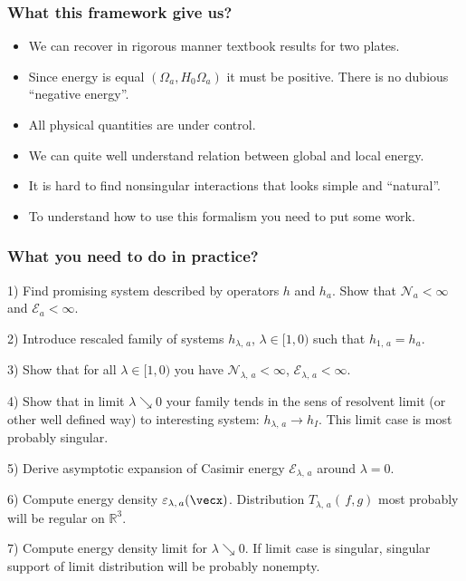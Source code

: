 \documentclass[10pt,t]{beamer}  %
\newcommand{\Ec}{\mathcal{E}}
\begin{document}
\begin{frame}
  \frametitle{What this framework give us?}


  \begin{itemize}
  \item We can recover in rigorous manner textbook results for two
    plates.

  \item Since energy is equal $( \Omega_{ a }, H_{ 0 } \Omega_{ a } )$
    it must be positive. There is no dubious ``negative energy''.

  \item All physical quantities are under control.

  \item We can quite well understand relation between global and local
    energy.

  \item It is hard to find nonsingular interactions that looks simple
    and ``natural''.

  \item To understand how to use this formalism you need to put some
    work.

  \end{itemize}

\end{frame}






\begin{frame}
  \frametitle{What you need to do in practice?}


  1) Find promising system described by operators $h$ and $h_{ a }$.
  Show that $\mathcal{N}_{ a } < \infty$ and $\Ec_{ a } < \infty$.

  2) Introduce rescaled family of systems $h_{ \lambda,\, a }$,
  $\lambda \in [ 1, 0 )$ such that $h_{ 1,\, a } = h_{ a }$.

  3) Show that for all $\lambda \in [ 1, 0 )$ you have
  $\mathcal{N}_{ \lambda,\, a } < \infty$,
  $\Ec_{ \lambda,\, a } < \infty$.

  4) Show that in limit $\lambda \searrow 0$ your family tends in the
  sens of resolvent limit (or other well defined way) to interesting
  system: $h_{ \lambda,\, a } \to h_{ I }$. This limit case is most
  probably singular.

  5) Derive asymptotic expansion of Casimir energy
  $\Ec_{ \lambda,\, a }$ around $\lambda = 0$.

  6) Compute energy density $\varepsilon_{ \lambda,\, a }( \vecx )$.
  Distribution $T_{ \lambda,\, a }( \, f, g )$ most probably will be
  regular on $\mathbb{R}^{ 3 }$.

  7) Compute energy density limit for $\lambda \searrow 0$. If limit
  case is singular, singular support of limit distribution will be
  probably nonempty.

\end{frame}
\end{document}
